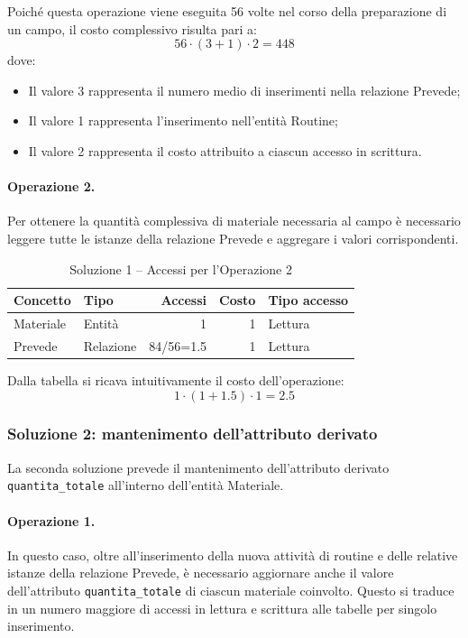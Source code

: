 \documentclass[11pt,a4paper]{article}
\begin{document}
Poiché questa operazione viene eseguita 56 volte nel corso della preparazione di un campo, il
costo complessivo risulta pari a:
\[
56 \cdot (3 + 1) \cdot 2 = 448
\]
dove:
\begin{itemize}
  \item Il valore 3 rappresenta il numero medio di inserimenti nella relazione Prevede;
  \item Il valore 1 rappresenta l'inserimento nell'entità Routine;
  \item Il valore 2 rappresenta il costo attribuito a ciascun accesso in scrittura.
\end{itemize}

\paragraph{Operazione 2.}
Per ottenere la quantità complessiva di materiale necessaria al campo è necessario leggere tutte
le istanze della relazione Prevede e aggregare i valori corrispondenti.

\begin{table}[h]
\centering
\caption{Soluzione 1 -- Accessi per l'Operazione 2}
\label{tab:sol1-op2}
\begin{tabular}{@{}llrrl@{}}
\toprule
\textbf{Concetto} & \textbf{Tipo} & \textbf{Accessi} & \textbf{Costo} & \textbf{Tipo accesso} \\
\midrule
Materiale & Entità    & 1        & 1 & Lettura \\
Prevede   & Relazione & 84/56=1.5 & 1 & Lettura \\
\bottomrule
\end{tabular}
\end{table}

Dalla tabella si ricava intuitivamente il costo dell'operazione:
\[
1 \cdot (1 + 1.5) \cdot 1 = 2.5
\]

\subsubsection{Soluzione 2: mantenimento dell'attributo derivato}

La seconda soluzione prevede il mantenimento dell'attributo derivato \texttt{quantita\_totale}
all'interno dell'entità Materiale.

\paragraph{Operazione 1.}
In questo caso, oltre all'inserimento della nuova attività di routine e delle relative istanze
della relazione Prevede, è necessario aggiornare anche il valore dell'attributo
\texttt{quantita\_totale} di ciascun materiale coinvolto. Questo si traduce in un numero
maggiore di accessi in lettura e scrittura alle tabelle per singolo inserimento.
\end{document}

